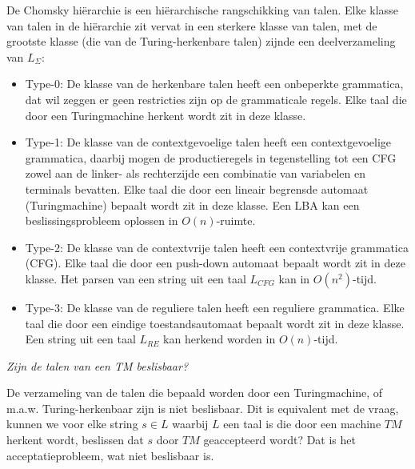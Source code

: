 De Chomsky hi\"erarchie is een hi\"erarchische rangschikking van talen. Elke klasse van talen in de hi\"erarchie zit vervat in een sterkere klasse van talen, met de grootste klasse (die van de Turing-herkenbare talen) zijnde een deelverzameling van $L_\Sigma$:
\begin{itemize}
\item Type-0: De klasse van de herkenbare talen heeft een onbeperkte grammatica, dat wil zeggen er geen restricties zijn op de grammaticale regels. Elke taal die door een Turingmachine herkent wordt zit in deze klasse.
\item Type-1: De klasse van de contextgevoelige talen heeft een contextgevoelige grammatica, daarbij mogen de productieregels in tegenstelling tot een CFG zowel aan de linker- als rechterzijde een combinatie van variabelen en terminals bevatten. Elke taal die door een lineair begrensde automaat (Turingmachine) bepaalt wordt zit in deze klasse. Een LBA kan een beslissingsprobleem oplossen in $O(n)$-ruimte.
\item Type-2: De klasse van de contextvrije talen heeft een contextvrije grammatica (CFG). Elke taal die door een push-down automaat bepaalt wordt zit in deze klasse. Het parsen van een string uit een taal $L_{CFG}$ kan in $O(n^2)$-tijd.
\item Type-3: De klasse van de reguliere talen heeft een reguliere grammatica. Elke taal die door een eindige toestandsautomaat bepaalt wordt zit in deze klasse. Een string uit een taal $L_{RE}$ kan herkend worden in $O(n)$-tijd.
\end{itemize}
\begin{center}
\end{center}

\textit{Zijn de talen van een TM beslisbaar?}

De verzameling van de talen die bepaald worden door een Turingmachine, of m.a.w. Turing-herkenbaar zijn is niet beslisbaar. Dit is equivalent met de vraag, kunnen we voor elke string $s \in L$ waarbij $L$ een taal is die door een machine $TM$ herkent wordt, beslissen dat $s$ door $TM$ geaccepteerd wordt? Dat is het acceptatieprobleem, wat niet beslisbaar is.


